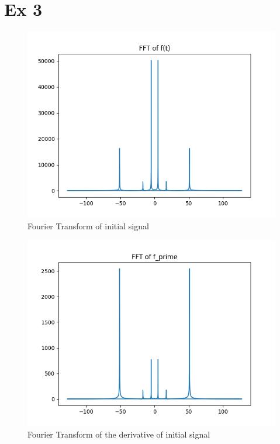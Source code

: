 \documentclass{article}
\begin{document}
\section{Ex 3}
\begin{figure}[H]
    \includegraphics[width=\textwidth]{HW2_3a.png}
    \caption{Fourier Transform of initial signal}
\end{figure}
\begin{figure}[H]
    \includegraphics[width=\textwidth]{HW2_3_FFT_f'.png}
    \caption{Fourier Transform of the derivative of initial signal}
\end{figure}
\end{document}
